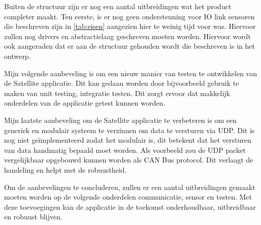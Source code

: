 \noindent Buiten de structuur zijn er nog een aantal uitbreidingen wat het product completer maakt. Ten eerste, is er nog geen ondersteuning voor IO link sensoren die beschreven zijn in \ref{tab:eisen} aangezien hier te weinig tijd voor was. Hiervoor zullen nog drivers en abstractielaag geschreven moeten worden. Hiervoor wordt ook aangeraden dat er aan de structuur gehouden wordt die beschreven is in het ontwerp. \newline

\noindent Mijn volgende aanbeveling is om een nieuw manier van testen te ontwikkelen van de Satellite applicatie. Dit kan gedaan worden door bijvoorbeeld gebruik te maken van unit testing, integratie testen. Dit zorgt ervoor dat makkelijk onderdelen van de applicatie getest kunnen worden. \newline

\noindent Mijn laatste aanbeveling om de Satellite applicatie te verbeteren is om een generiek en modulair systeem te verzinnen om data te versturen via UDP. Dit is nog niet geïmplementeerd zodat het modulair is, dit betekent dat het versturen van data handmatig bepaald moet worden. Als voorbeeld zou de UDP packet vergelijkbaar opgebouwd kunnen worden als CAN Bus protocol. Dit verlaagt de handeling en helpt met de robuustheid. \newline


\noindent Om de aanbevelingen te concluderen, zullen er een aantal uitbreidingen gemaakt moeten worden op de volgende onderdelen communicatie, sensor en testen. Met deze toevoegingen kan de applicatie in de toekomst onderhoudbaar, uitbreidbaar en robuust blijven.